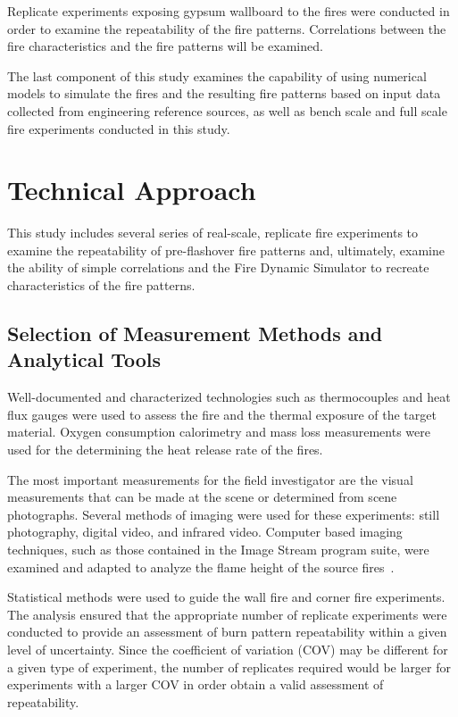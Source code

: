\documentclass[twoside]{uocthesis}
\begin{document}
Replicate experiments exposing gypsum wallboard to the fires were conducted in order to examine the repeatability of the fire patterns.  Correlations between the fire characteristics and the fire patterns will be examined.

The last component of this study examines the capability of using numerical models to simulate the fires and the resulting fire patterns based on input data collected from engineering reference sources, as well as bench scale and full scale fire experiments conducted in this study.

\section{Technical Approach}


This study includes several series of real-scale, replicate fire experiments to examine the repeatability of pre-flashover fire patterns and, ultimately, examine the ability of simple correlations and the Fire Dynamic Simulator to recreate characteristics of the fire patterns.

\subsection{Selection of Measurement Methods and Analytical Tools}

Well-documented and characterized technologies such as thermocouples and heat flux gauges were used to assess the fire and the thermal exposure of the target material.  Oxygen consumption calorimetry and mass loss measurements were used for the determining the heat release rate of the fires.

The most important measurements for the field investigator are the visual measurements that can be made at the scene or determined from scene photographs. Several methods of imaging were used for these experiments: still photography, digital video, and infrared video.  Computer based imaging techniques, such as those contained in the Image Stream program suite, were examined and adapted to analyze the flame height of the source fires~\cite{Nokes:2011}.

Statistical methods were used to guide the wall fire and corner fire experiments.  The analysis ensured that the appropriate number of replicate experiments were conducted to provide an assessment of burn pattern repeatability within a given level of uncertainty.  Since the coefficient of variation (COV) may be different for a given type of experiment, the number of replicates required would be larger for experiments with a larger COV in order obtain a valid assessment of repeatability.
\end{document}
